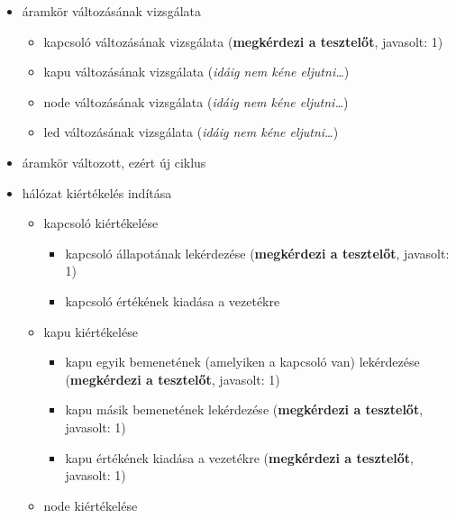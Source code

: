 {\begin{itemize}
\begin{itemize}
\begin{itemize}
\begin{itemize}
		\item led bemenetének lekérdezése (\textbf{megkérdezi a tesztelőt}, javasolt: 1)
	\end{itemize}
\end{itemize}
\item áramkör változásának vizsgálata
\begin{itemize}
\setlength{\itemsep}{0cm}%
\setlength{\parskip}{0cm}%
\setlength{\itemindent}{-50pt}%
	\item kapcsoló változásának vizsgálata (\textbf{megkérdezi a tesztelőt}, javasolt: 1)
	\item kapu változásának vizsgálata (\textit{idáig nem kéne eljutni\ldots})
	\item node változásának vizsgálata (\textit{idáig nem kéne eljutni\ldots})
	\item led változásának vizsgálata (\textit{idáig nem kéne eljutni\ldots})
\end{itemize}
\item áramkör változott, ezért új ciklus
\item hálózat kiértékelés indítása
\begin{itemize}
\setlength{\itemsep}{0cm}%
\setlength{\parskip}{0cm}%
\setlength{\itemindent}{-50pt}%
	\item kapcsoló kiértékelése
	\begin{itemize}
	\setlength{\itemsep}{0cm}%
	\setlength{\parskip}{0cm}%
	\setlength{\itemindent}{-65pt}%
		\item kapcsoló állapotának lekérdezése (\textbf{megkérdezi a tesztelőt}, javasolt: 1)
		\item kapcsoló értékének kiadása a vezetékre
	\end{itemize}
	\item kapu kiértékelése
	\begin{itemize}
	\setlength{\itemsep}{0cm}%
	\setlength{\parskip}{0cm}%
	\setlength{\itemindent}{-65pt}%
		\item kapu egyik bemenetének (amelyiken a kapcsoló van) lekérdezése (\textbf{megkérdezi a tesztelőt}, javasolt: 1)
		\item kapu másik bemenetének lekérdezése (\textbf{megkérdezi a tesztelőt}, javasolt: 1)
		\item kapu értékének kiadása a vezetékre (\textbf{megkérdezi a tesztelőt}, javasolt: 1)
	\end{itemize}
\item node kiértékelése
	\begin{itemize}
	\setlength{\itemsep}{0cm}%
	\setlength{\parskip}{0cm}%

\end{itemize}
\end{itemize}
\end{itemize}
\end{itemize}}
